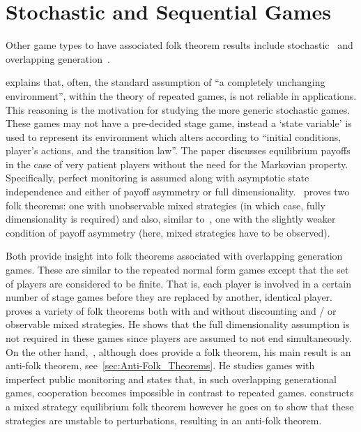 \section{Stochastic and Sequential Games}\label{sec:Stochastic_and_Sequential_Games}
Other game types to have associated folk theorem results include
stochastic~\cite{Dutta1995} and overlapping generation~\cite{Bhaskar1998,
Gossner1996}.

\cite{Dutta1995} explains that, often, the standard assumption of ``a completely
unchanging environment'', within the theory of repeated games, is not reliable
in applications. This reasoning is the motivation for studying the more generic
stochastic games. These games may not have a pre-decided stage game, instead a
`state variable' is used to represent its environment which alters according to
``initial conditions, player's actions, and the transition law''. The paper
discusses equilibrium payoffs in the case of very patient players without the
need for the Markovian property. Specifically, perfect monitoring is assumed
along with asymptotic state independence and either of payoff asymmetry or full
dimensionality.~\cite{Dutta1995} proves two folk theorems: one with unobservable
mixed strategies (in which case, fully dimensionality is required) and also,
similar to~\cite{Abreu1994}, one with the slightly weaker condition of payoff
asymmetry (here, mixed strategies have to be observed).

Both\cite{Bhaskar1998, Gossner1996} provide insight into folk theorems
associated with overlapping generation games. These are similar to the repeated
normal form games except that the set of players are considered to be finite.
That is, each player is involved in a certain number of stage games before they
are replaced by another, identical player. \cite{Gossner1996} proves a variety
of folk theorems both with and without discounting and / or observable mixed
strategies. He shows that the full dimensionality assumption is not required in
these games since players are assumed to not end simultaneously. On the other
hand,~\cite{Bhaskar1998}, although does provide a folk theorem, his main result
is an anti-folk theorem, see~\ref{sec:Anti-Folk_Theorems}. He studies games with
imperfect public monitoring and states that, in such overlapping generational
games, cooperation becomes impossible in contrast to repeated games.
\cite{Bhaskar1998} constructs a mixed strategy equilibrium folk theorem however
he goes on to show that these strategies are unstable to perturbations,
resulting in an anti-folk theorem.

